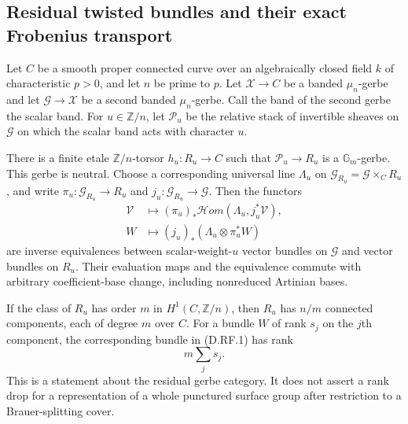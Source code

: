 \subsection{Residual twisted bundles and their exact Frobenius transport}

\begin{proposition}
\label{D:residual-twisted-spectral-category}
Let $C$ be a smooth proper connected curve over an algebraically closed
field $k$ of characteristic $p>0$, and let $n$ be prime to $p$.
Let $\mathcal X\to C$ be a banded $\mu_n$-gerbe and let
$\mathcal G\to\mathcal X$ be a second banded $\mu_n$-gerbe.
Call the band of the second gerbe the scalar band. For
$u\in\mathbb Z/n$, let $\mathcal P_u$ be the relative stack of
invertible sheaves on $\mathcal G$ on which the scalar band acts
with character $u$.

There is a finite etale $\mathbb Z/n$-torsor
$h_u:R_u\to C$ such that $\mathcal P_u\to R_u$ is a
$\mathbb G_m$-gerbe. This gerbe is neutral. Choose a corresponding
universal line $\Lambda_u$ on
$\mathcal G_{R_u}=\mathcal G\times_C R_u$, and write
$\pi_u:\mathcal G_{R_u}\to R_u$ and
$j_u:\mathcal G_{R_u}\to\mathcal G$.
Then the functors
\[
 \begin{split}
 \mathcal V&\longmapsto
    (\pi_u)_*\mathcal Hom(\Lambda_u,j_u^*\mathcal V),\\
 W&\longmapsto (j_u)_*(\Lambda_u\otimes\pi_u^*W)
 \end{split}                                                    \tag{D.RF.1}
\]
are inverse equivalences between scalar-weight-$u$ vector bundles on
$\mathcal G$ and vector bundles on $R_u$. Their evaluation maps and
the equivalence commute with arbitrary coefficient-base change,
including nonreduced Artinian bases.

If the class of $R_u$ has order $m$ in
$H^1(C,\mathbb Z/n)$, then $R_u$ has $n/m$ connected components,
each of degree $m$ over $C$. For a bundle $W$ of rank $s_j$ on the
$j$th component, the corresponding bundle in (D.RF.1) has rank
\[
                         m\sum_j s_j.                         \tag{D.RF.2}
\]
This is a statement about the residual gerbe category. It does not
assert a rank drop for a representation of a whole punctured surface
group after restriction to a Brauer-splitting cover.
\end{proposition}

